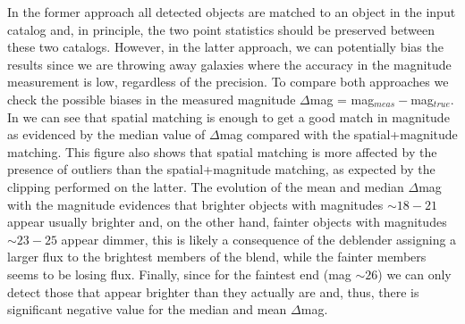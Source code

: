 \documentclass[\docopts]{\docclass}
\begin{document}
In the former approach all detected objects are matched to an object in the input catalog and, in principle, the two point statistics should be preserved between these two catalogs. However, in the latter approach, we can potentially bias the results since we are throwing away galaxies where the accuracy in the magnitude measurement is low, regardless of the precision. To compare both approaches we check the possible biases in the measured magnitude $\Delta$mag = mag$_{meas} - $mag$_{true}$. In  we can see that spatial matching is enough to get a good match in magnitude as evidenced by the median value of $\Delta$mag compared with the spatial+magnitude matching. This figure also shows that spatial matching is more affected by the presence of outliers than the spatial+magnitude matching, as expected by the clipping performed on the latter. The evolution of the mean and median $\Delta$mag with the magnitude evidences that brighter objects with magnitudes $\sim 18-21$ appear usually brighter and, on the other hand, fainter objects with magnitudes $\sim 23-25$ appear dimmer, this is likely a consequence of the deblender assigning a larger flux to the brightest members of the blend, while the fainter members seems to be losing flux. Finally, since for the faintest end (mag $\sim 26$) we can only detect those that appear brighter than they actually are and, thus, there is significant negative value for the median and mean $\Delta$mag.
\end{document}
